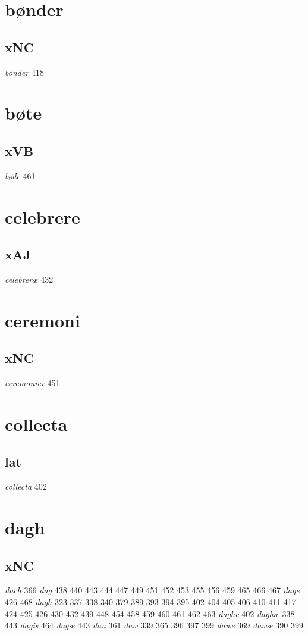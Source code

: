 \documentclass[a4paper,twocolumn]{article}
\begin{document}
\section{bønder}
\label{sec:orgd2857ee}
\subsection{xNC}
\label{sec:orgbc476a5}
\emph{bønder} 418 
\section{bøte}
\label{sec:org748bd0a}
\subsection{xVB}
\label{sec:org761c19b}
\emph{bøde} 461 
\section{celebrere}
\label{sec:orgd56caf0}
\subsection{xAJ}
\label{sec:org7ba8260}
\emph{celebreræ} 432 
\section{ceremoni}
\label{sec:org391bb99}
\subsection{xNC}
\label{sec:org84b1cf5}
\emph{ceremonier} 451 
\section{collecta}
\label{sec:orgdc6fe28}
\subsection{lat}
\label{sec:org8f3f6af}
\emph{collecta} 402 
\section{dagh}
\label{sec:orgfdf8a1d}
\subsection{xNC}
\label{sec:org5fe96c5}
\emph{dach} 366 \emph{dag} 438 440 443 444 447 449 451 452 453 455 456 459 465 466 467 \emph{dage} 426 468 \emph{dagh} 323 337 338 340 379 389 393 394 395 402 404 405 406 410 411 417 424 425 426 430 432 439 448 454 458 459 460 461 462 463 \emph{daghe} 402 \emph{daghæ} 338 443 \emph{dagis} 464 \emph{dagæ} 443 \emph{dau} 361 \emph{daw} 339 365 396 397 399 \emph{dawe} 369 \emph{dawæ} 390 399 
\end{document}

